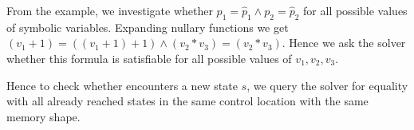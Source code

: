 From the example, we investigate whether $p_1 = \widehat{p}_1 \wedge p_2 =
\widehat{p}_2$ for all possible values of symbolic variables. Expanding nullary
functions we get $(v_1 + 1) = ((v_1 + 1) + 1) \wedge (v_2 * v_3) = (v_2 * v_3)$. Hence
we ask the \SMT solver whether this formula is satisfiable for all possible
values of $v_1, v_2, v_3$.

Hence to check whether \DIVINE encounters a new state $s$, we query the \SMT solver
for equality with all already reached states in the same control location with the same memory shape.



